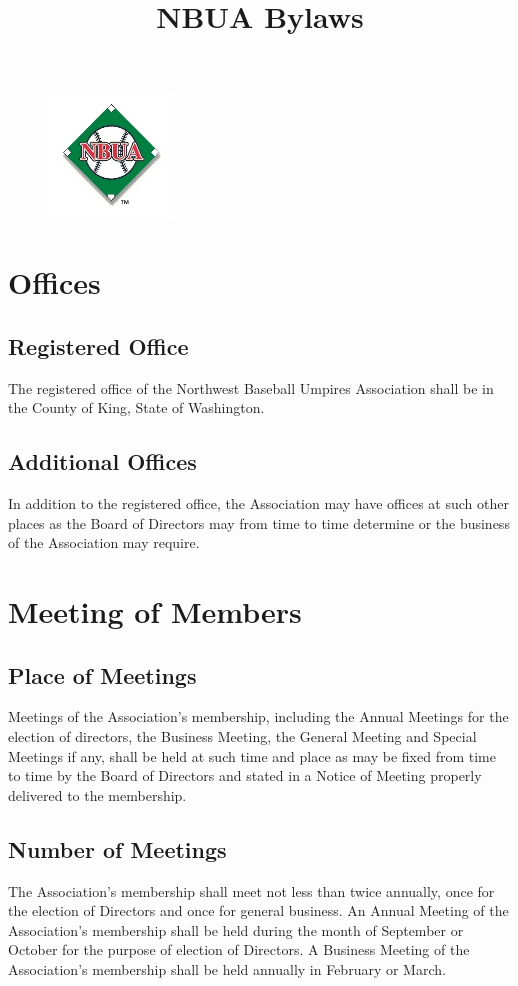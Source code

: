 \documentclass[letterpaper,11pt]{article}
\title{NBUA Bylaws}
\begin{document}
\begin{figure}
\centering
\includegraphics[width=0.3\textwidth]{NBUALogo.jpg}
\end{figure}


\maketitle


\section{Offices}
\subsection{Registered Office}
The registered office of the Northwest Baseball Umpires Association shall be in the County of King, State of Washington.
\subsection{Additional Offices}
In addition to the registered office, the Association may have offices at such other places as the Board of Directors may from time to time determine or the business of the Association may require.
\section{Meeting of Members}
\subsection{Place of Meetings}
Meetings of the Association's membership, including the Annual Meetings for the election of directors, the Business Meeting, the General Meeting and Special Meetings if any, shall be held at such time and place as may be fixed from time to time by the Board of Directors and stated in a Notice of Meeting properly delivered to the membership.
\subsection{Number of Meetings}
The Association's membership shall meet not less than twice annually, once for the election of Directors and once for general business. An Annual Meeting of the Association's membership shall be held during the month of September or October for the purpose of election of Directors. A Business Meeting of the Association's membership shall be held annually in February or March.
\end{document}
